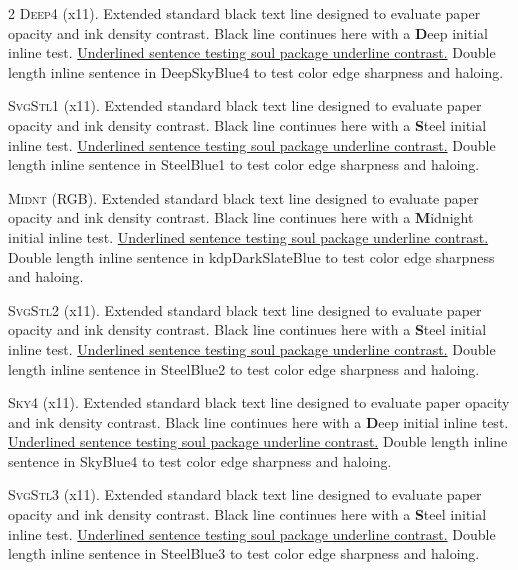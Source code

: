 \begin{multicols}{2}
\lettrine[lines=2]{\textcolor{DeepSkyBlue4}{D}}{eep4} (x11). Extended standard black text line designed to evaluate paper opacity and ink density contrast. Black line continues here with a \textbf{\textcolor{DeepSkyBlue4}{D}}eep initial inline test. \ul{Underlined sentence testing soul package underline contrast.} \textcolor{DeepSkyBlue4}{Double length inline sentence in DeepSkyBlue4 to test color edge sharpness and haloing.}


\lettrine[lines=2]{\textcolor{SteelBlue1}{S}}{vgStl1} (x11). Extended standard black text line designed to evaluate paper opacity and ink density contrast. Black line continues here with a \textbf{\textcolor{SteelBlue1}{S}}teel initial inline test. \ul{Underlined sentence testing soul package underline contrast.} \textcolor{SteelBlue1}{Double length inline sentence in SteelBlue1 to test color edge sharpness and haloing.}


\lettrine[lines=2]{\textcolor{kdpDarkSlateBlue}{M}}{idnt} (RGB). Extended standard black text line designed to evaluate paper opacity and ink density contrast. Black line continues here with a \textbf{\textcolor{kdpDarkSlateBlue}{M}}idnight initial inline test. \ul{Underlined sentence testing soul package underline contrast.} \textcolor{kdpDarkSlateBlue}{Double length inline sentence in kdpDarkSlateBlue to test color edge sharpness and haloing.}


\lettrine[lines=2]{\textcolor{SteelBlue2}{S}}{vgStl2} (x11). Extended standard black text line designed to evaluate paper opacity and ink density contrast. Black line continues here with a \textbf{\textcolor{SteelBlue2}{S}}teel initial inline test. \ul{Underlined sentence testing soul package underline contrast.} \textcolor{SteelBlue2}{Double length inline sentence in SteelBlue2 to test color edge sharpness and haloing.}

\lettrine[lines=2]{\textcolor{SkyBlue4}{S}}{ky4} (x11). Extended standard black text line designed to evaluate paper opacity and ink density contrast. Black line continues here with a \textbf{\textcolor{SkyBlue4}{D}}eep initial inline test. \ul{Underlined sentence testing soul package underline contrast.} \textcolor{SkyBlue4}{Double length inline sentence in SkyBlue4 to test color edge sharpness and haloing.}


\lettrine[lines=2]{\textcolor{SteelBlue3}{S}}{vgStl3} (x11). Extended standard black text line designed to evaluate paper opacity and ink density contrast. Black line continues here with a \textbf{\textcolor{SteelBlue3}{S}}teel initial inline test. \ul{Underlined sentence testing soul package underline contrast.} \textcolor{SteelBlue3}{Double length inline sentence in SteelBlue3 to test color edge sharpness and haloing.}



\end{multicols}
